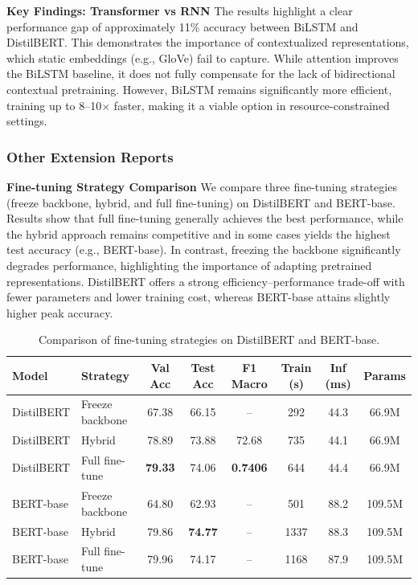 \noindent \textbf{Key Findings: Transformer vs RNN}
The results highlight a clear performance gap of approximately 11\% accuracy between BiLSTM and DistilBERT. This demonstrates the importance of contextualized representations, which static embeddings (e.g., GloVe) fail to capture. While attention improves the BiLSTM baseline, it does not fully compensate for the lack of bidirectional contextual pretraining. However, BiLSTM remains significantly more efficient, training up to 8--10$\times$ faster, making it a viable option in resource-constrained settings.

\subsubsection{Other Extension Reports}
\noindent \textbf{Fine-tuning Strategy Comparison} We compare three fine-tuning strategies (freeze backbone, hybrid, and full fine-tuning) on DistilBERT and BERT-base. Results show that full fine-tuning generally achieves the best performance, while the hybrid approach remains competitive and in some cases yields the highest test accuracy (e.g., BERT-base). In contrast, freezing the backbone significantly degrades performance, highlighting the importance of adapting pretrained representations. DistilBERT offers a strong efficiency--performance trade-off with fewer parameters and lower training cost, whereas BERT-base attains slightly higher peak accuracy.
\begin{table}[t]
\centering
\small
\begin{tabular}{llcccccc}
\toprule
Model & Strategy & Val Acc & Test Acc & F1 Macro & Train (s) & Inf (ms) & Params \\
\midrule
DistilBERT & Freeze backbone & 67.38 & 66.15 & -- & 292  & 44.3 & 66.9M \\
DistilBERT & Hybrid          & 78.89 & 73.88 & 72.68 & 735  & 44.1 & 66.9M \\
DistilBERT & Full fine-tune  & \textbf{79.33} & 74.06 & \textbf{0.7406} & 644  & 44.4 & 66.9M \\
\midrule
BERT-base  & Freeze backbone & 64.80 & 62.93 & -- & 501  & 88.2 & 109.5M \\
BERT-base  & Hybrid          & 79.86 & \textbf{74.77} & -- & 1337 & 88.3 & 109.5M \\
BERT-base  & Full fine-tune  & 79.96 & 74.17 & -- & 1168 & 87.9 & 109.5M \\
\bottomrule
\end{tabular}
\caption{Comparison of fine-tuning strategies on DistilBERT and BERT-base.}
\label{tab:finetune}
\end{table}


